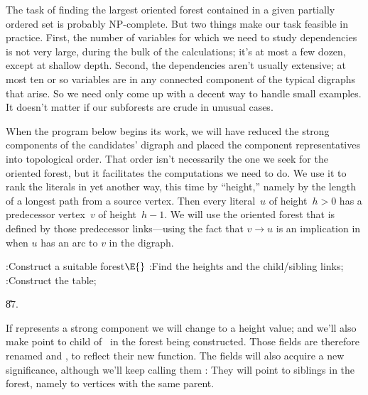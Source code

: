 The task of finding the largest oriented forest contained in a given
partially ordered set is probably NP-complete.
But two things make our task feasible in practice.
First, the number of variables for which we need to study dependencies
is not very large, during the bulk of the calculations; it's at most a
few dozen, except at shallow depth. Second, the dependencies aren't usually
extensive; at most ten or so variables are in any connected component of the
typical digraphs that arise. So we need only come up with a decent way to
handle small examples. It doesn't matter if our subforests are crude
in unusual cases.

\fi

When the program below begins its work, we will have
reduced the
strong components of the candidates' digraph and placed the component
representatives into topological order. That order isn't necessarily
the one we seek for the oriented forest, but it facilitates the
computations we need to do. We use it to rank the literals in yet
another way, this time by ``height,'' namely by
the length of a longest path from a source vertex.
Then every literal~$u$ of height~$h>0$ has a predecessor vertex~$v$
of height~$h-1$. We will use the oriented forest that is defined by those
predecessor links---using the fact that $v\to u$ is an implication
in  when $u$ has an arc to $v$ in the 
digraph.

\Y\B\4:Construct a suitable forest\X${}\E{}$\6
:Find the heights and the child/sibling links\X;\6
:Construct the  table\X;\par
\U87.\fi

If  represents a strong component we will change %
 to a
height value; and we'll also make  point to child
of~
in the forest being constructed.
Those fields are therefore renamed  and , to
reflect their new
function. The  fields will also acquire a new significance,
although
we'll keep calling them : They will point to siblings in the
forest,
namely to vertices with the same parent.


